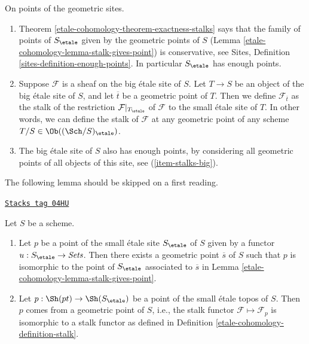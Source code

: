 \begin{remarks}
\label{remarks-enough-points}
On points of the geometric sites.
\begin{enumerate}
\item Theorem \ref{etale-cohomology-theorem-exactness-stalks} says that the family of points
of $S_\etale$ given by the geometric points of $S$
(Lemma \ref{etale-cohomology-lemma-stalk-gives-point}) is conservative, see
Sites, Definition \ref{sites-definition-enough-points}.
In particular $S_\etale$ has enough points.
\item Suppose $\mathcal{F}$ is a sheaf on the big \'etale site
\label{etale-cohomology-item-stalks-big}
of $S$. Let $T \to S$ be an object of the big \'etale site of $S$,
and let $\overline{t}$ be a geometric point of $T$. Then we define
$\mathcal{F}_{\overline{t}}$ as the stalk
of the restriction $\mathcal{F}|_{T_\etale}$ of $\mathcal{F}$
to the small \'etale site of $T$. In other words, we can define
the stalk of $\mathcal{F}$ at any geometric point of any
scheme $T/S \in \Ob((\Sch/S)_\etale)$.
\item The big \'etale site of $S$ also has enough points, by
considering all geometric points of all objects of this site, see
(\ref{item-stalks-big}).
\end{enumerate}
\end{remarks}

The following lemma should be skipped on a first reading.

\begin{lemma}
\label{etale-cohomology-lemma-points-small-etale-site}
\href{https://stacks.math.columbia.edu/tag/04HU}{\texttt{Stacks tag 04HU}}

Let $S$ be a scheme.
\begin{enumerate}
\item Let $p$ be a point of the small \'etale site
$S_\etale$ of $S$ given by a functor
$u : S_\etale \to \textit{Sets}$.
Then there exists a geometric point $\overline{s}$ of $S$ such that
$p$ is isomorphic to the point of $S_\etale$ associated to
$\overline{s}$ in
Lemma \ref{etale-cohomology-lemma-stalk-gives-point}.
\item Let $p : \Sh(pt) \to \Sh(S_\etale)$ be a point
of the small \'etale topos of $S$. Then $p$ comes from a geometric point
of $S$, i.e., the stalk functor $\mathcal{F} \mapsto \mathcal{F}_p$
is isomorphic to a stalk functor as defined in
Definition \ref{etale-cohomology-definition-stalk}.
\end{enumerate}
\end{lemma}

